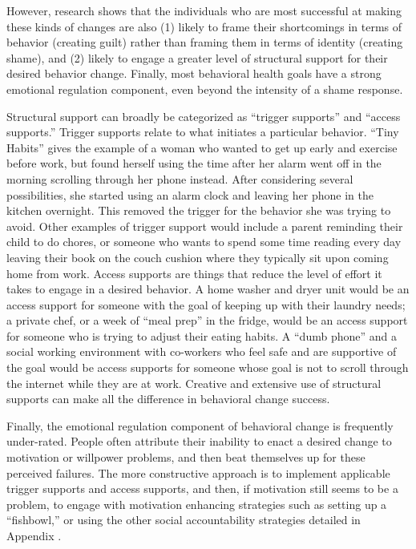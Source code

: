 \documentclass[12pt,letterpaper]{book}
\begin{document}
However, research shows that the individuals who are most successful at making these kinds of changes are also (1) likely to frame their shortcomings in terms of behavior (creating guilt) rather than framing them in terms of identity (creating shame), and (2) likely to engage a greater level of structural support for their desired behavior change. Finally, most behavioral health goals have a strong emotional regulation component, even beyond the intensity of a shame response.

Structural support can broadly be categorized as “trigger supports” and “access supports.” Trigger supports relate to what initiates a particular behavior. “Tiny Habits” gives the example of a woman who wanted to get up early and exercise before work, but found herself using the time after her alarm went off in the morning scrolling through her phone instead. After considering several possibilities, she started using an alarm clock and leaving her phone in the kitchen overnight. This removed the trigger for the behavior she was trying to avoid. Other examples of trigger support would include a parent reminding their child to do chores, or someone who wants to spend some time reading every day leaving their book on the couch cushion where they typically sit upon coming home from work. Access supports are things that reduce the level of effort it takes to engage in a desired behavior. A home washer and dryer unit would be an access support for someone with the goal of keeping up with their laundry needs; a private chef, or a week of “meal prep” in the fridge, would be an access support for someone who is trying to adjust their eating habits. A “dumb phone” and a social working environment with co-workers who feel safe and are supportive of the goal would be access supports for someone whose goal is not to scroll through the internet while they are at work. Creative and extensive use of structural supports can make all the difference in behavioral change success.

Finally, the emotional regulation component of behavioral change is frequently under-rated. People often attribute their inability to enact a desired change to motivation or willpower problems, and then beat themselves up for these perceived failures. The more constructive approach is to implement applicable trigger supports and access supports, and then, if motivation still seems to be a problem, to engage with motivation enhancing strategies such as setting up a “fishbowl,” or using the other social accountability strategies detailed in Appendix \todo{}.
\end{document}
